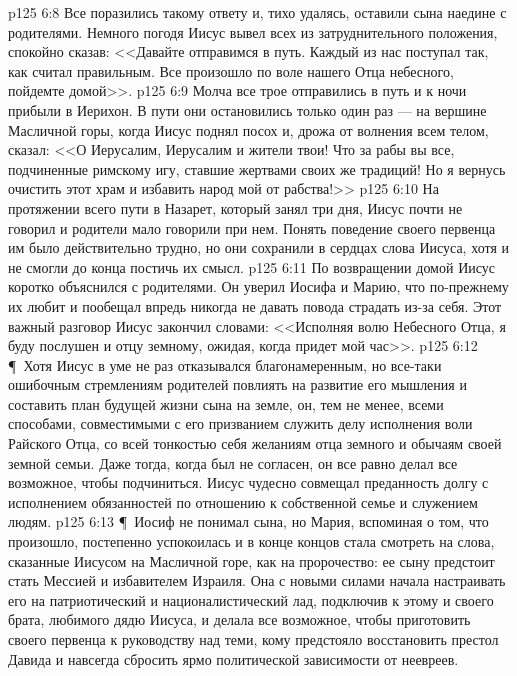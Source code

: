 \vs p125 6:8 Все поразились такому ответу и, тихо удалясь, оставили сына наедине с родителями. Немного погодя Иисус вывел всех из затруднительного положения, спокойно сказав: <<Давайте отправимся в путь. Каждый из нас поступал так, как считал правильным. Все произошло по воле нашего Отца небесного, пойдемте домой>>.
\vs p125 6:9 Молча все трое отправились в путь и к ночи прибыли в Иерихон. В пути они остановились только один раз --- на вершине Масличной горы, когда Иисус поднял посох и, дрожа от волнения всем телом, сказал: <<О Иерусалим, Иерусалим и жители твои! Что за рабы вы все, подчиненные римскому игу, ставшие жертвами своих же традиций! Но я вернусь очистить этот храм и избавить народ мой от рабства!>>
\vs p125 6:10 На протяжении всего пути в Назарет, который занял три дня, Иисус почти не говорил и родители мало говорили при нем. Понять поведение своего первенца им было действительно трудно, но они сохранили в сердцах слова Иисуса, хотя и не смогли до конца постичь их смысл.
\vs p125 6:11 По возвращении домой Иисус коротко объяснился с родителями. Он уверил Иосифа и Марию, что по\hyp{}прежнему их любит и пообещал впредь никогда не давать повода страдать из\hyp{}за себя. Этот важный разговор Иисус закончил словами: <<Исполняя волю Небесного Отца, я буду послушен и отцу земному, ожидая, когда придет мой час>>.
\vs p125 6:12 \P\ Хотя Иисус в уме не раз отказывался  благонамеренным, но все\hyp{}таки ошибочным стремлениям родителей повлиять на развитие его мышления и составить план будущей жизни сына на земле, он, тем не менее, всеми способами, совместимыми с его призванием служить делу исполнения воли Райского Отца, со всей тонкостью  себя желаниям отца земного и обычаям своей земной семьи. Даже тогда, когда был не согласен, он все равно делал все возможное, чтобы подчиниться. Иисус чудесно совмещал преданность долгу с исполнением обязанностей по отношению к собственной семье и служением людям.
\vs p125 6:13 \P\ Иосиф не понимал сына, но Мария, вспоминая о том, что произошло, постепенно успокоилась и в конце концов стала смотреть на слова, сказанные Иисусом на Масличной горе, как на пророчество: ее сыну предстоит стать Мессией и избавителем Израиля. Она с новыми силами начала настраивать его на патриотический и националистический лад, подключив к этому и своего брата, любимого дядю Иисуса, и делала все возможное, чтобы приготовить своего первенца к руководству над теми, кому предстояло восстановить престол Давида и навсегда сбросить ярмо политической зависимости от неевреев.
